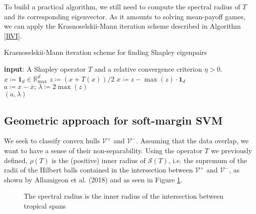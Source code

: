\documentclass[oneside,UKenglish,a4paper]{amsart}
\numberwithin{equation}{section}
\numberwithin{figure}{section}
\theoremstyle{plain}
\theoremstyle{definition}
\theoremstyle{plain}
\theoremstyle{remark}
\theoremstyle{plain}
\theoremstyle{definition}
\theoremstyle{definition}
\newcommand{\Input}{\textbf{input}}
\begin{document}

%
To build a practical algorithm, we still need to compute the spectral
radius of $T$ and its corresponding eigenvector. As it amounts to solving mean-payoff games, we can apply the Krasnoselskii-Mann iteration scheme described in Algorithm \ref{RVI}.
\begin{algorithm}[h!]
\caption{Krasnoselskii-Mann iteration scheme for finding Shapley eigenpairs}\label{RVI}
\begin{algorithmic}[1]
  \State \Input: A Shapley operator $T$ and a relative convergence criterion $\eta>0$.
\State $ x \coloneqq  \mathbf{1}_d \in \mathbb{R}_{\max}^d $
%
\Repeat \State $z \coloneqq  \left(x + T(x)\right)/2$
\State $x \coloneqq z - \max(z)\cdot\textbf{1}_d$
%
\State $a \coloneqq  x-\overline{x}; \, \lambda \coloneqq 2 \max(z)$\\

\Return $(a, \lambda)$
\end{algorithmic}
\end{algorithm}


\subsection{Geometric approach for soft-margin SVM}

We seek to classify convex hulls $\mathcal{V}^{+}$ and $\mathcal{V}^{-}$.
Assuming that the data overlap, we want to have a sense of their
non-separability. Using the operator $T$ we previously defined,  $\rho(T)$ is the
(positive) inner radius of $\mathcal{S}(T)$, i.e. the supremum of
the radii of the Hilbert balls contained in the intersection between
$\mathcal{V}^{+}$ and $\mathcal{V}^{-}$, as shown by Allamigeon et al. (2018) \cite{Allamigeon2018} and as seen in Figure \ref{fig:softmargin_ex}.

\begin{figure}[!h]
    \centering
    \begin{subfigure}{0.5\textwidth}
        \centering
        \resizebox{\linewidth}{!}{%
        \centering
            \clipbox{0.2\width{} 0.2\height{} 0.2\width{} 0.2\height{}}{}
        }
    \end{subfigure}
    
    \caption{The spectral radius is the inner radius of the intersection between tropical spans}
    \label{fig:softmargin_ex}
\end{figure}
\end{document}
